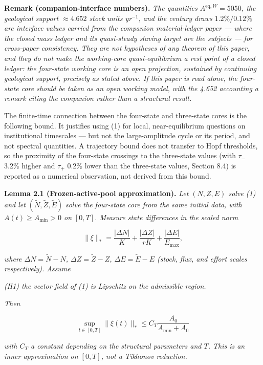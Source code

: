 \documentclass[11pt]{article}
\begin{document}
\textbf{Remark (companion-interface numbers).} \emph{The quantities
\(A^{\mathrm{eq},W} = 5050\), the geological support \(\approx 4.652\)
stock units yr\(^{-1}\), and the century draws \(1.2\%/0.12\%\) are
interface values carried from the companion material-ledger paper ---
where the closed mass ledger and its quasi-steady slaving target are the
subjects --- for cross-paper consistency. They are not hypotheses of any
theorem of this paper, and they do not make the working-core
quasi-equilibrium a rest point of a closed ledger: the four-state
working core is an open projection, sustained by continuing geological
support, precisely as stated above. If this paper is read alone, the
four-state core should be taken as an open working model, with the 4.652
accounting a remark citing the companion rather than a structural
result.}

The finite-time connection between the four-state and three-state cores
is the following bound. It justifies using (1) for local,
near-equilibrium questions on institutional timescales --- but not the
large-amplitude cycle or its period, and not spectral quantities. A
trajectory bound does not transfer to Hopf thresholds, so the proximity
of the four-state crossings to the three-state values (with \(\tau_-\)
3.2\% higher and \(\tau_+\) 0.2\% lower than the three-state values,
Section 8.4) is reported as a numerical observation, not derived from
this bound.

\textbf{Lemma 2.1 (Frozen-active-pool approximation).} \emph{Let
\((N, Z, E)\) solve (1) and let \((\tilde N, \tilde Z, \tilde E)\) solve
the four-state core from the same initial data, with
\(A(t) \ge A_{\min} > 0\) on \([0,T]\). Measure state differences in the
scaled norm}

\[\|\xi\|_* = \frac{|\Delta N|}{K} + \frac{|\Delta Z|}{rK} + \frac{|\Delta E|}{E_{\max}},\]

\emph{where \(\Delta N = \tilde N - N\), \(\Delta Z = \tilde Z - Z\),
\(\Delta E = \tilde E - E\) (stock, flux, and effort scales
respectively). Assume}

\emph{(H1) the vector field of (1) is Lipschitz on the admissible
region.}

\emph{Then}

\[\sup_{t \in [0,T]} \|\xi(t)\|_* \le C_T \frac{A_0}{A_{\min} + A_0}\]

\emph{with \(C_T\) a constant depending on the structural parameters and
\(T\). This is an inner approximation on \([0,T]\), not a Tikhonov
reduction.}
\end{document}
